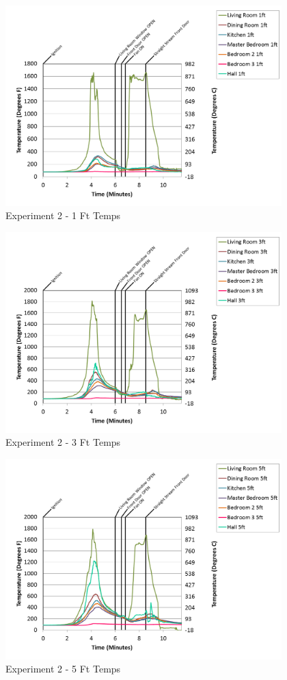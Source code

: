 \documentclass{article}
\begin{document}
\begin{appendices}
\begin{figure}[h!]
	\centering
	\includegraphics[height=3.05in]{0_Images/Results_Charts/Exp_2_Charts/1FtTemps.png}
	\caption{Experiment 2 - 1 Ft Temps}
\end{figure}


\begin{figure}[h!]
	\centering
	\includegraphics[height=3.05in]{0_Images/Results_Charts/Exp_2_Charts/3FtTemps.png}
	\caption{Experiment 2 - 3 Ft Temps}
\end{figure}

\clearpage

\begin{figure}[h!]
	\centering
	\includegraphics[height=3.05in]{0_Images/Results_Charts/Exp_2_Charts/5FtTemps.png}
	\caption{Experiment 2 - 5 Ft Temps}
\end{figure}



\end{appendices}
\end{document}
